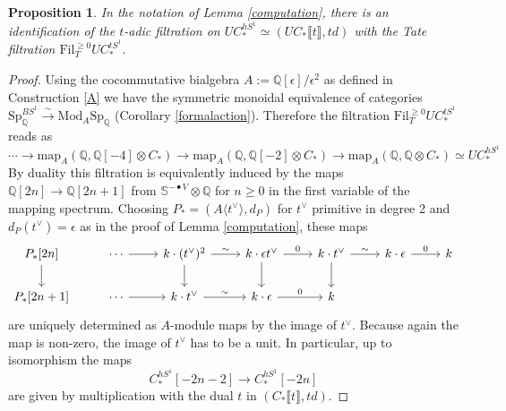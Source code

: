\documentclass[10pt, reqno]{amsart}
\newtheorem{proposition}[theorem]{Proposition}
\theoremstyle{definition}
\theoremstyle{remark}
\newcommand{\Q}{\mathbb{Q}}
\newcommand{\Sp}{\mathrm{Sp}}
\newcommand{\Fil}{\mathrm{Fil}}
\newcommand{\map}{\mathrm{map}}
\renewcommand{\S}{\mathbb{S}}
\newcommand{\llrrbra}[1]{\llbracket #1\rrbracket}
\newcommand{\Mod}{\mathrm{Mod}}
\begin{document}
\begin{proposition}\label{t-adic filtration}
	In the notation of Lemma \ref{computation}, there is an identification of the $t$-adic filtration on $UC_*^{hS^1}\simeq (UC_*\llrrbra t, td)$ with the Tate filtration $\Fil_T^{\geq 0} UC_*^{tS^1}$.
\end{proposition}
\begin{proof}
	Using the cocommutative bialgebra $A:= \Q[\epsilon]/\epsilon^2$ as defined in Construction \ref{A} we have the symmetric monoidal equivalence of categories $\Sp_\Q^{BS^1}\xrightarrow\sim\Mod_A\Sp_\Q$ (Corollary \ref{formalaction}). Therefore the filtration $\Fil^{\geq 0}_TUC_*^{tS^1}$ reads as
	\[\cdots \to\map_A(\Q,\Q[-4]\otimes C_*)\to\map_A(\Q,\Q[-2]\otimes C_*)\to\map_A(\Q,\Q\otimes C_*)\simeq UC_*^{hS^1}\]
	By duality this filtration is equivalently induced by the maps $\Q[2n]\to\Q[2n+1]$ from $\S^{-\bullet V}\otimes \Q$ for $n\geq 0$ in the first variable of the mapping spectrum. Choosing $P_*=(A\langle t^\vee\rangle, d_P)$ for $t^\vee$ primitive in degree 2 and $d_P(t^\vee)=\epsilon$ as in the proof of Lemma \ref{computation}, these maps
	\[
	\begin{tikzcd}
	P_*[2n]\ar[d]&\cdots\ar[r]&k\cdot (t^\vee)^2\ar[r,"\sim"]\ar[d]&k\cdot \epsilon t^\vee\ar[r,"0"]\ar[d]&k\cdot t^\vee\ar[r,"\sim"]\ar[d]&k\cdot \epsilon\ar[r,"0"]&k\\
		P_*[2n+1]&\cdots\ar[r]&k\cdot t^\vee\ar[r,"\sim"]&k\cdot \epsilon\ar[r,"0"]&k
	\end{tikzcd}
	\]
	are uniquely determined as $A$-module maps by the image of $t^\vee$. Because again the map is non-zero, the image of $t^\vee$ has to be a unit. In particular, up to isomorphism the maps
	\[C_*^{hS^1}[-2n-2]\to C_*^{hS^1}[-2n]\]
	are given by multiplication with the dual $t$ in $(C_*\llrrbra t, td)$.
\end{proof}


\printbibliography
\end{document}
